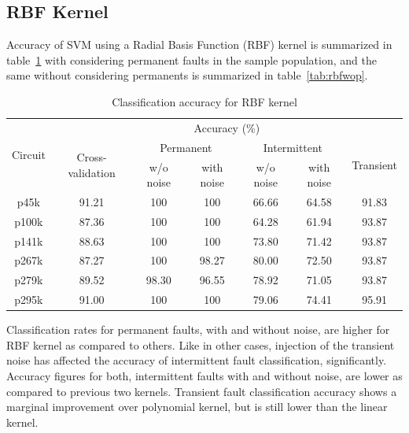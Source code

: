 \subsection{RBF Kernel}

Accuracy of SVM using a Radial Basis Function (RBF) kernel is summarized in table~\ref{tab:rbfwp} with considering permanent faults in the sample population, and the same without considering permanents is summarized in table~\ref{tab:rbfwop}.

\begin{table}[h]
\captionsetup{justification=centering}
\begin{tabular}{ccccccc}
\hline
\multirow{3}{*}{Circuit} & \multicolumn{6}{c}{Accuracy (\%)}\\ \cline{2-7} 
                         & \multirow{2}{*}{Cross-validation} & \multicolumn{2}{c}{Permanent} & \multicolumn{2}{c}{Intermittent} & \multirow{2}{*}{Transient} \\ \cline{3-6}
                         &                                   & w/o noise     & with noise    & w/o noise      & with noise      &                            \\ \hline
p45k                     & 91.21                             & 100           & 100           & 66.66          & 64.58           & 91.83                      \\
p100k                    & 87.36                             & 100           & 100           & 64.28          & 61.94           & 93.87                      \\
p141k                    & 88.63                             & 100           & 100           & 73.80          & 71.42           & 93.87                      \\
p267k                    & 87.27                             & 100           & 98.27         & 80.00          & 72.50           & 93.87                      \\
p279k                    & 89.52                             & 98.30         & 96.55         & 78.92          & 71.05           & 93.87                      \\
p295k                    & 91.00                             & 100           & 100           & 79.06          & 74.41           & 95.91                     \\
\hline                                                     
\end{tabular}
\caption {Classification accuracy for RBF kernel}
\label{tab:rbfwp}
\end{table}
Classification rates for permanent faults, with and without noise, are higher for RBF kernel as compared to others. Like in other cases, injection of the transient noise has affected the accuracy of intermittent fault classification, significantly. Accuracy figures for both, intermittent faults with and without noise, are lower as compared to previous two kernels. Transient fault classification accuracy shows a marginal improvement over polynomial kernel, but is still lower than the linear kernel.

